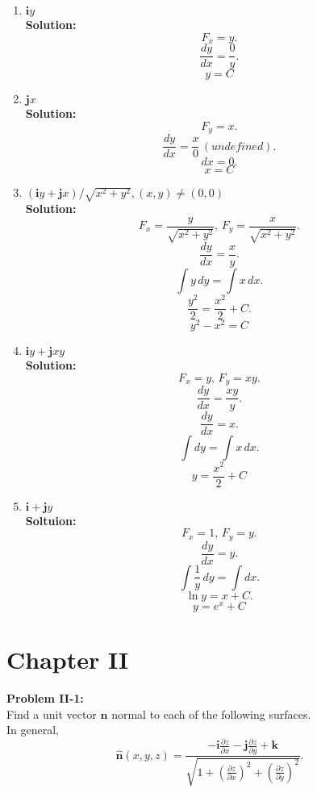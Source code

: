 \documentclass[11pt]{article}
\begin{document}
\begin{enumerate}[label= \textbf{\Alph*.}]
\begin{enumerate}[label= \textbf{\Alph*.}]
	\item $\mathbf{i}y$\\

		\textbf{Solution:}
		\[
		F_x = y
		.\] 
		\[
		\frac{dy}{dx} = \frac{0}{y}
		.\] 
\[
	\boxed{y = C}
\] 
\item $\mathbf{j}x$\\

	\textbf{Solution:}
	 \[
	F_y = x
	.\] 
	\[
	\frac{dy}{dx} = \frac{x}{0} \, (undefined)
	.\] 
	\[
	dx = 0
	.\] 
	\[
		\boxed{x=C}
	\] 

\item $(\mathbf{i}y + \mathbf{j}x) / \sqrt{x^2 + y^2}, (x,y) \neq (0,0) $\\

	\textbf{Solution:}
	\[
	F_x = \frac{y}{\sqrt{x^2+y^2}}, \, F_y = \frac{x}{\sqrt{x^2 + y^2} }
	.\] 
	\[
	\frac{dy}{dx} = \frac{x}{y}
	.\] 
	\[
	\int y \, dy = \int x \, dx
	.\] 
	\[
	\frac{y^2}{2} = \frac{x^2}{2} + C
	.\] 
	\[
		\boxed{y^2 - x^2 = C}
	\] 
\item $\mathbf{i}y + \mathbf{j}xy$\\

	\textbf{Solution:}
	\[
	F_x = y, \, F_y = xy
	.\] 
	\[
	\frac{dy}{dx} = \frac{xy}{y}
	.\] 
	\[
	\frac{dy}{dx} = x
	.\] 
	\[
	\int dy = \int x \, dx
	.\] 
	\[
		\boxed{y = \frac{x^2}{2} + C}
	\] 
\item $\mathbf{i} + \mathbf{j}y$\\

	\textbf{Soltuion:}
	 \[
	F_x = 1, \, F_y = y
	.\] 
	\[
	\frac{dy}{dx} = y
	.\] 
	\[
	\int \frac{1}{y} \, dy = \int dx
	.\] 
	\[
	\ln y = x + C
	.\] 
	\[
	\boxed{y = e^x + C}
	\]

	\end{enumerate}
\end{enumerate}

\newpage
\section{Chapter II}
\textbf{Problem II-1:}\\
Find a unit vector $\mathbf{\hat{n}}$ normal to each of the following surfaces. \\

In general,
  \[
  \mathbf{\hat{n}}(x,y,z) = \frac{-\mathbf{i} \frac{\partial z}{\partial x} - \mathbf{j} \frac{\partial z}{\partial y} + \mathbf{k}}{\sqrt{1 + \left(\frac{\partial z}{\partial x}\right)^2 + \left(\frac{\partial z}{\partial y}\right)^2}}
  .\]
\end{document}
